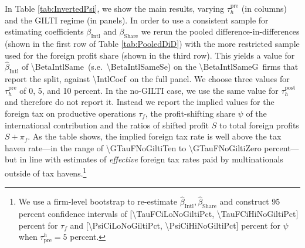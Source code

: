 \documentclass[11pt,letterpaper]{article}
\newcommand{\CoefNum}[1]{\num[round-mode=places,round-precision=3]{#1}}
\newcommand{\RoundNum}[1]{\num[round-mode=places,round-precision=0]{#1}}
\begin{document}
In Table \ref{tab:InvertedPsi}, we show the main results, varying $\tau_h^{\text{pre}}$ (in columns)
and the GILTI regime (in panels). In order to use a consistent sample for estimating
coefficients $\beta_{\text{Intl}}$ and $\beta_{\text{Share}}$ we rerun
the pooled difference-in-differences 
(shown in the first row of Table \ref{tab:PooledDiD})
with the more restricted sample used
for the foreign profit share (shown in the third row). This yields
a value for $\hat\beta_{\text{Intl}}$
of \CoefNum{\BetaIntlSame}\ (s.e.\ \CoefNum{\BetaIntlSameSe}) on the
\RoundNum{\BetaIntlSameG}\ firms that report the split, against
\CoefNum{\IntlCoef}\ on the full panel.
We choose three values for $\tau_h^{\text{pre}}$ of 0, 5, and 
10 percent. In the no-GILTI case, we use the same value for $\tau_h^{\text{post}}$
and therefore do not report it. Instead we report the implied values
for the foreign tax on productive operations $\tau_f$, the profit-shifting
share $\psi$ of the international contribution
and the ratios of shifted profit $S$ to total foreign profits
$S+\pi_f$. As the table shows, the implied
foreign tax rate is well above the tax haven rate---in the range of
\RoundNum{\GTauFNoGiltiTen} to \RoundNum{\GTauFNoGiltiZero}
percent---but in line with estimates of \emph{effective} foreign
tax rates paid by multinationals outside of tax havens.\footnote{%
We use a firm-level bootstrap to re-estimate $\hat\beta_{\text{Intl}},\hat\beta_{\text{Share}}$ 
and construct 95 percent confidence intervals of 
[\RoundNum{\TauFCiLoNoGiltiPct}, \RoundNum{\TauFCiHiNoGiltiPct}] percent for $\tau_f$ 
and 
[\RoundNum{\PsiCiLoNoGiltiPct}, \RoundNum{\PsiCiHiNoGiltiPct}] percent for $\psi$ 
when $\tau^h_{\text{pre}}=5$ percent.}
\end{document}
